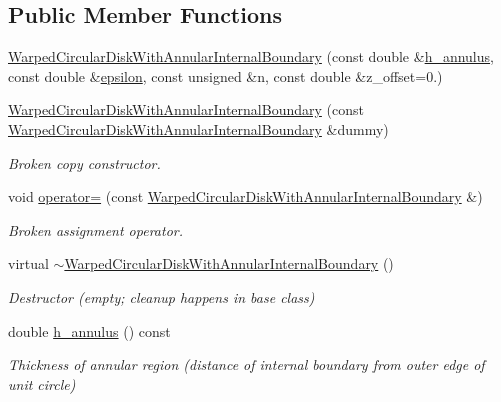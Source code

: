 \subsection*{Public Member Functions}
\begin{DoxyCompactItemize}
\item 
\hyperlink{classoomph_1_1WarpedCircularDiskWithAnnularInternalBoundary_a97d0a5b064c7d8eba3a99e1a84a1de69}{Warped\+Circular\+Disk\+With\+Annular\+Internal\+Boundary} (const double \&\hyperlink{classoomph_1_1WarpedCircularDiskWithAnnularInternalBoundary_aaa718ad4761397bd44aaac093ed35a9f}{h\+\_\+annulus}, const double \&\hyperlink{classoomph_1_1WarpedCircularDisk_a275692443cbe30be492c6ef33040b0be}{epsilon}, const unsigned \&n, const double \&z\+\_\+offset=0.)
\item 
\hyperlink{classoomph_1_1WarpedCircularDiskWithAnnularInternalBoundary_ad41f0d8afd8bbaf9a3b5a7d8d3a852b7}{Warped\+Circular\+Disk\+With\+Annular\+Internal\+Boundary} (const \hyperlink{classoomph_1_1WarpedCircularDiskWithAnnularInternalBoundary}{Warped\+Circular\+Disk\+With\+Annular\+Internal\+Boundary} \&dummy)
\begin{DoxyCompactList}\small\item\em Broken copy constructor. \end{DoxyCompactList}\item 
void \hyperlink{classoomph_1_1WarpedCircularDiskWithAnnularInternalBoundary_a7f7cbd42f9399bfff46f5c4cc07218e5}{operator=} (const \hyperlink{classoomph_1_1WarpedCircularDiskWithAnnularInternalBoundary}{Warped\+Circular\+Disk\+With\+Annular\+Internal\+Boundary} \&)
\begin{DoxyCompactList}\small\item\em Broken assignment operator. \end{DoxyCompactList}\item 
virtual \hyperlink{classoomph_1_1WarpedCircularDiskWithAnnularInternalBoundary_a2494621470d9fa2d920da5235f32e18a}{$\sim$\+Warped\+Circular\+Disk\+With\+Annular\+Internal\+Boundary} ()
\begin{DoxyCompactList}\small\item\em Destructor (empty; cleanup happens in base class) \end{DoxyCompactList}\item 
double \hyperlink{classoomph_1_1WarpedCircularDiskWithAnnularInternalBoundary_aaa718ad4761397bd44aaac093ed35a9f}{h\+\_\+annulus} () const
\begin{DoxyCompactList}\small\item\em Thickness of annular region (distance of internal boundary from outer edge of unit circle) \end{DoxyCompactList}\end{DoxyCompactItemize}
